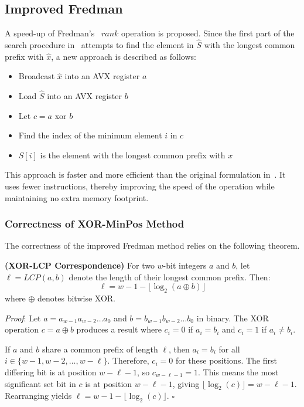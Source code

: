 \subsection{Improved Fredman}
\label{improved-fredman}
A speed-up of Fredman's~\cite{FREDMAN1993424} $rank$ operation is proposed. Since the first part of the search procedure in~\cite{FREDMAN1993424} attempts to find the element in $\hat{S}$ with the longest common prefix with $\hat{x}$, a new approach is described as follows:
\begin{itemize}
    \item Broadcast $\hat{x}$ into an AVX register $a$
    \item Load $\hat{S}$ into an AVX register $b$
    \item Let $c = a$ xor $b$
    \item Find the index of the minimum element $i$ in $c$
    \item $S[i]$ is the element with the longest common prefix with $x$
\end{itemize}
This approach is faster and more efficient than the original formulation in~\cite{FREDMAN1993424}. It uses fewer instructions, thereby improving the speed of the operation while maintaining no extra memory footprint.

\subsubsection{Correctness of XOR-MinPos Method}

The correctness of the improved Fredman method relies on the following theorem.

\begin{lemma}
\textbf{(XOR-LCP Correspondence)} For two $w$-bit integers $a$ and $b$, let $\ell = LCP(a, b)$ denote the length of their longest common prefix. Then:
\begin{equation}
    \ell = w - 1 - \lfloor \log_2(a \oplus b) \rfloor
\end{equation}
where $\oplus$ denotes bitwise XOR.
\end{lemma}

\textit{Proof}: Let $a = a_{w-1}a_{w-2}\ldots a_0$ and $b = b_{w-1}b_{w-2}\ldots b_0$ in binary. The XOR operation $c = a \oplus b$ produces a result where $c_i = 0$ if $a_i = b_i$ and $c_i = 1$ if $a_i \neq b_i$.

If $a$ and $b$ share a common prefix of length $\ell$, then $a_i = b_i$ for all $i \in \{w-1, w-2, \ldots, w-\ell\}$. Therefore, $c_i = 0$ for these positions. The first differing bit is at position $w - \ell - 1$, so $c_{w-\ell-1} = 1$. This means the most significant set bit in $c$ is at position $w - \ell - 1$, giving $\lfloor \log_2(c) \rfloor = w - \ell - 1$. Rearranging yields $\ell = w - 1 - \lfloor \log_2(c) \rfloor$. $\square$

